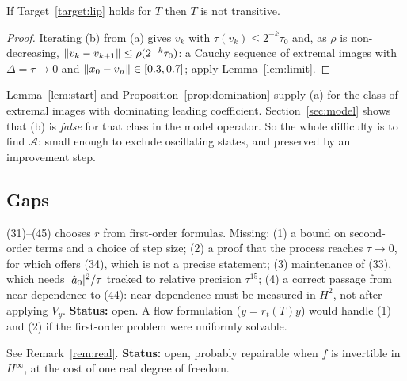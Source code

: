 \begin{proposition}\stproved{}
If Target~\ref{target:lip} holds for $T$ then $T$ is not transitive.
\end{proposition}
\begin{proof}
Iterating (b) from (a) gives $v_k$ with $\tau(v_k)\le2^{-k}\tau_0$ and, as $\rho$ is
non-decreasing, $\lVert v_k-v_{k+1}\rVert\le\rho(2^{-k}\tau_0)$: a Cauchy sequence of extremal images with $\Delta=\tau\to0$ and
$\lVert x_0-v_n\rVert\in[0.3,0.7]$; apply Lemma~\ref{lem:limit}.
\end{proof}

Lemma~\ref{lem:start} and Proposition~\ref{prop:domination} supply (a) for the class of extremal
images with dominating leading coefficient. Section~\ref{sec:model} shows that (b) is
\emph{false} for that class in the model operator. So the whole difficulty is to find
$\mathcal A$: small enough to exclude oscillating states, and preserved by an improvement step.

\subsection{Gaps}

\begin{gap}\label{gap:secondorder}
\paper{} (31)--(45) chooses $r$ from first-order formulas. Missing: (1) a bound on second-order
terms and a choice of step size; (2) a proof that the process reaches $\tau\to0$, for which
\paper{} offers (34), which is not a precise statement; (3) maintenance of (33), which needs
$\lvert \hat a_0\rvert^2/\tau$ tracked to relative precision $\tau^{15}$; (4) a correct passage from
near-dependence to (44): near-dependence must be measured in $H^2$, not after applying $V_y$.
\textbf{Status:} open. A flow formulation ($\dot y=r_t(T)y$) would handle (1) and (2) if the
first-order problem were uniformly solvable.
\end{gap}

\begin{gap}\label{gap:real}
See Remark~\ref{rem:real}. \textbf{Status:} open, probably repairable when $f$ is invertible in
$H^\infty$, at the cost of one real degree of freedom.
\end{gap}

